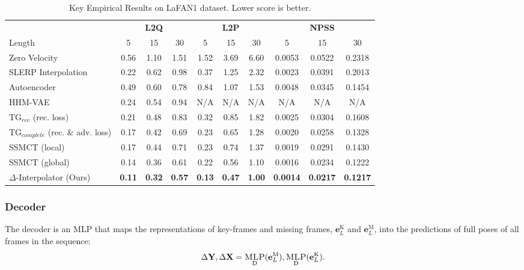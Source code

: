 \documentclass[letterpaper]{article} \usepackage[]{aaai23}  \usepackage{times}  \usepackage{helvet}  \usepackage{courier}  \usepackage[hyphens]{url}  \usepackage{graphicx} \urlstyle{rm} \def\UrlFont{\rm}  \usepackage{natbib}  \usepackage{caption} \frenchspacing  \setlength{\pdfpagewidth}{8.5in} \setlength{\pdfpageheight}{11in}
\renewcommand{\vec}[1]{\mathbf{#1}}
\DeclareMathOperator{\mlp}{\textsc{MLP}}
\begin{document}
\begin{table*}[!ht]
\centering
\caption{Key Empirical Results on LaFAN1 dataset. Lower score is better.}
\begin{tabularx}{\textwidth}{l@{\extracolsep{\fill}} ccccccccc}
&\multicolumn{3}{c}{\textbf{L2Q}} &\multicolumn{3}{c}{\textbf{L2P}} &\multicolumn{3}{c}{\textbf{NPSS}} \\
\cmidrule(lr){2-4}\cmidrule(lr){5-7}\cmidrule(lr){8-10}
Length & 5 & 15 & 30 & 5 & 15 & 30 & 5 & 15 & 30\\
\cmidrule(lr){1-10}
Zero Velocity & 0.56 & 1.10 & 1.51 & 1.52 & 3.69 & 6.60 & 0.0053 & 0.0522 & 0.2318 \\
SLERP Interpolation & 0.22 & 0.62 & 0.98 & 0.37 & 1.25 & 2.32 & 0.0023 & 0.0391 & 0.2013 \\
\cmidrule(lr){1-10}
Autoencoder \cite{kaufmann2020} & 0.49 & 0.60 & 0.78 & 0.84 & 1.07 & 1.53 & 0.0048 & 0.0345 & 0.1454 \\
HHM-VAE \cite{li2021taskgeneric} & 0.24 & 0.54 & 0.94 & N/A & N/A & N/A & N/A & N/A & N/A \\ 
$\textrm{TG}_{rec}$ (rec. loss) \cite{harvey2020robust} & 0.21 & 0.48 & 0.83 & 0.32 & 0.85 & 1.82 & 0.0025 & 0.0304 & 0.1608 \\
$\textrm{TG}_{complete}$ (rec. \& adv. loss) \cite{harvey2020robust} & 0.17 & 0.42 & 0.69 & 0.23 & 0.65 & 1.28 & 0.0020 & 0.0258 & 0.1328 \\
SSMCT (local) \cite{duan2021singleshot}  & 0.17 & 0.44 & 0.71 & 0.23 & 0.74 & 1.37 & 0.0019 & 0.0291 & 0.1430\\
SSMCT (global) \cite{duan2021singleshot}  & 0.14 & 0.36 & 0.61 & 0.22 & 0.56 & 1.10 & 0.0016 & 0.0234 & 0.1222 \\
$\Delta$-Interpolator (Ours)  & \bf{0.11}	& \bf{0.32} &	\bf{0.57} &	\bf{0.13} &	\bf{0.47} &	\bf{1.00} &	\bf{0.0014} &	\bf{0.0217} &	\bf{0.1217} \\
\bottomrule
\end{tabularx}\label{table:key_results}
\end{table*}



\subsubsection{Decoder} 
The decoder is an MLP that maps the representations of key-frames and missing frames, $\vec{e}_{L}^{\textrm{K}}$ and $\vec{e}_{L}^{\textrm{M}}$, into the predictions of full poses of all frames in the sequence:
\begin{align}
    \Delta\vec{Y}, \Delta\vec{X} = \mlp_{\textrm{D}}(\vec{e}_{L}^{\textrm{M}}), \mlp_{\textrm{D}}(\vec{e}_{L}^{\textrm{K}}). \nonumber
\end{align}
\end{document}
